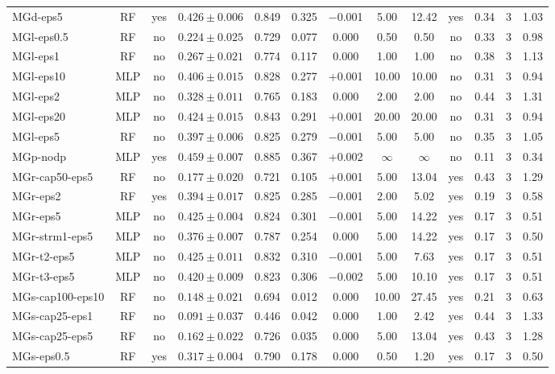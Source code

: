 \begin{landscape}
\begin{longtable}{lccccccccccc c}
MGd-eps5 & RF & yes & $0.426 \pm 0.006$ & 0.849 & 0.325 & $-$0.001 & 5.00 & 12.42 & yes & 0.34 & 3 & 1.03 \\
MGl-eps0.5 & RF & no & $0.224 \pm 0.025$ & 0.729 & 0.077 & 0.000 & 0.50 & 0.50 & no & 0.33 & 3 & 0.98 \\
MGl-eps1 & RF & no & $0.267 \pm 0.021$ & 0.774 & 0.117 & 0.000 & 1.00 & 1.00 & no & 0.38 & 3 & 1.13 \\
MGl-eps10 & MLP & no & $0.406 \pm 0.015$ & 0.828 & 0.277 & +0.001 & 10.00 & 10.00 & no & 0.31 & 3 & 0.94 \\
MGl-eps2 & MLP & no & $0.328 \pm 0.011$ & 0.765 & 0.183 & 0.000 & 2.00 & 2.00 & no & 0.44 & 3 & 1.31 \\
MGl-eps20 & MLP & no & $0.424 \pm 0.015$ & 0.843 & 0.291 & +0.001 & 20.00 & 20.00 & no & 0.31 & 3 & 0.94 \\
MGl-eps5 & RF & no & $0.397 \pm 0.006$ & 0.825 & 0.279 & $-$0.001 & 5.00 & 5.00 & no & 0.35 & 3 & 1.05 \\
MGp-nodp & MLP & yes & $0.459 \pm 0.007$ & 0.885 & 0.367 & +0.002 & $\infty$ & $\infty$ & no & 0.11 & 3 & 0.34 \\
MGr-cap50-eps5 & RF & no & $0.177 \pm 0.020$ & 0.721 & 0.105 & +0.001 & 5.00 & 13.04 & yes & 0.43 & 3 & 1.29 \\
MGr-eps2 & RF & yes & $0.394 \pm 0.017$ & 0.825 & 0.285 & $-$0.001 & 2.00 & 5.02 & yes & 0.19 & 3 & 0.58 \\
MGr-eps5 & MLP & no & $0.425 \pm 0.004$ & 0.824 & 0.301 & $-$0.001 & 5.00 & 14.22 & yes & 0.17 & 3 & 0.51 \\
MGr-strm1-eps5 & MLP & no & $0.376 \pm 0.007$ & 0.787 & 0.254 & 0.000 & 5.00 & 14.22 & yes & 0.17 & 3 & 0.50 \\
MGr-t2-eps5 & MLP & no & $0.425 \pm 0.011$ & 0.832 & 0.310 & $-$0.001 & 5.00 & 7.63 & yes & 0.17 & 3 & 0.51 \\
MGr-t3-eps5 & MLP & no & $0.420 \pm 0.009$ & 0.823 & 0.306 & $-$0.002 & 5.00 & 10.10 & yes & 0.17 & 3 & 0.51 \\
MGs-cap100-eps10 & RF & no & $0.148 \pm 0.021$ & 0.694 & 0.012 & 0.000 & 10.00 & 27.45 & yes & 0.21 & 3 & 0.63 \\
MGs-cap25-eps1 & RF & no & $0.091 \pm 0.037$ & 0.446 & 0.042 & 0.000 & 1.00 & 2.42 & yes & 0.44 & 3 & 1.33 \\
MGs-cap25-eps5 & RF & no & $0.162 \pm 0.022$ & 0.726 & 0.035 & 0.000 & 5.00 & 13.04 & yes & 0.43 & 3 & 1.28 \\
MGs-eps0.5 & RF & yes & $0.317 \pm 0.004$ & 0.790 & 0.178 & 0.000 & 0.50 & 1.20 & yes & 0.17 & 3 & 0.50 \\

\end{longtable}
\end{landscape}
